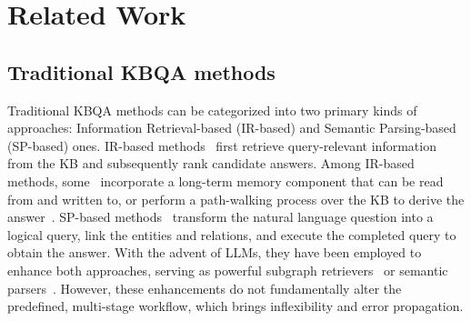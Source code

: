 
\section{Related Work}

\subsection{Traditional KBQA methods} 
Traditional KBQA methods can be categorized into two primary kinds of approaches: Information Retrieval-based (IR-based) and Semantic Parsing-based (SP-based) ones. IR-based methods~\citep{miller2016kvmem, liu2022graftnet, sun2019pullnet, saxena2020embd, shi2021transfernet, zhang2022subgraph} first retrieve query-relevant information from the KB and subsequently rank candidate answers. Among IR-based methods, some~\citep{bordes2015large, chen2019bidirectional} incorporate a long-term memory component that can be read from and written to, or perform a path-walking process over the KB to derive the answer~\citep{qiu2020stepwise, ren2021lego}. SP-based methods~\citep{sun2020sparqa, chen2019uhop, lanquery, jiangunikgqa, ye2022rng, shu2022tiara} transform the natural language question into a logical query, link the entities and relations, and execute the completed query to obtain the answer. With the advent of LLMs, they have been employed to enhance both approaches, serving as powerful subgraph retrievers~\citep{zhao2024kg, liu2024dual} or semantic parsers~\citep{li2023few, nie2024code}. However, these enhancements do not fundamentally alter the predefined, multi-stage workflow, which brings inflexibility and error propagation.
